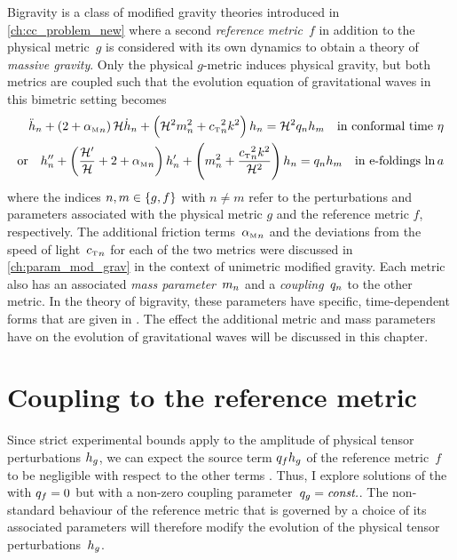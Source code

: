 \documentclass[12pt,parskip=half]{scrreprt}
\begin{document}
Bigravity is a class of modified gravity theories introduced in \autoref{ch:cc_problem_new} where a second \emph{reference metric}~\(f\) in addition to the physical metric~\(g\) is considered with its own dynamics to obtain a theory of \emph{massive gravity}. Only the physical \(g\)-metric induces physical gravity, but both metrics are coupled such that the evolution equation of gravitational waves in this bimetric setting becomes \autocite{Amendola2015}
\begin{subequations}\label{eq:evolution_bimetric}
\begin{align}
	\ddconf{h}\ofmetr{n} + \del{2 + \alphaMofmetr{n}} \Hconf \dconf{h}\ofmetr{n} + \del{\Hconf^2 \mofmetr{n}^2 + \cTofmetr{n}^2 k^2} h\ofmetr{n} = \Hconf^2 \qofmetr{n} h\ofmetr{m} \quad \text{in conformal time \(\conft\)} \\
    \text{or} \quad \ddefold{h}\ofmetr{n} + \del{\frac{\defold{\Hconf}}{\Hconf} + 2 + \alphaMofmetr{n}} \defold{h}\ofmetr{n} + \del{\mofmetr{n}^2 + \frac{\cTofmetr{n}^2 k^2}{\Hconf^2}} h\ofmetr{n} = \qofmetr{n} h\ofmetr{m} \quad \text{in e-foldings \(\efold\)}
\end{align}
\end{subequations}
where the indices \(n,m \in \cbr{g,f}\) with \(n \neq m\) refer to the perturbations and parameters associated with the physical metric \(g\) and the reference metric \(f\), respectively. The additional friction terms~\({\alpha_{\textnormal{\tiny{M}}}}_{n}\) and the deviations from the speed of light~\({c_{\textnormal{\tiny{T}}}}_{n}\) for each of the two metrics were discussed in \autoref{ch:param_mod_grav} in the context of unimetric modified gravity. Each metric also has an associated \emph{mass parameter}~\(m_{n}\) and a \emph{coupling}~\(q_{n}\) to the other metric. In the theory of bigravity, these parameters have specific, time-dependent forms that are given in \cite{Amendola2015}. The effect the additional metric and mass parameters have on the evolution of gravitational waves will be discussed in this chapter.

\section{Coupling to the reference metric}\label{sec:bimetric_coupling}

Since strict experimental bounds apply to the amplitude of physical tensor perturbations \(h_{g}\), we can expect the source term \(q_{f}h_{g}\) of the reference metric~\(f\) to be negligible with respect to the other terms \autocite{Amendola2015}. Thus, I explore solutions of the  with \(q_{f}=0\) but with a non-zero coupling parameter~\(q_{g}=\textnormal{\textit{const.}}\). The non-standard behaviour of the reference metric that is governed by a choice of its associated parameters will therefore modify the evolution of the physical tensor perturbations~\(h_{g}\). 
\end{document}
